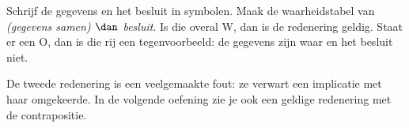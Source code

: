\begin{werkwijze}
Schrijf de gegevens en het besluit in symbolen. Maak de waarheidstabel van \textit{(gegevens samen) $\dan$ besluit}. Is die overal W, dan is de redenering geldig. Staat er een O, dan is die rij een tegenvoorbeeld: de gegevens zijn waar en het besluit niet.
\end{werkwijze}

De tweede redenering is een veelgemaakte fout: ze verwart een implicatie met haar omgekeerde. In de volgende oefening zie je ook een geldige redenering met de contrapositie.

\begin{oefeningen}
\end{oefeningen}

\opdrachtenkop

\begin{oefeningen}























\end{oefeningen}


\begin{oefeningen}







\end{oefeningen}


